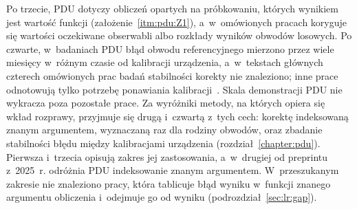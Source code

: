 Po trzecie, PDU dotyczy obliczeń opartych na próbkowaniu, których wynikiem jest wartość funkcji (założenie~\ref{itm:pdu:Z1}), a~w~omówionych pracach koryguje się wartości oczekiwane obserwabli albo rozkłady wyników obwodów losowych.
Po czwarte, w~badaniach PDU błąd obwodu referencyjnego mierzono przez wiele miesięcy w~różnym czasie od kalibracji urządzenia, a~w~tekstach głównych czterech omówionych prac badań stabilności korekty nie znaleziono; inne prace odnotowują tylko potrzebę ponawiania kalibracji~\cite{maciejewski_mitigation_2020,van_den_berg_probabilistic_2023,cai2023quantum}.
Skala demonstracji PDU nie wykracza poza pozostałe prace.
Za wyróżniki metody, na których opiera się wkład rozprawy, przyjmuje się drugą i~czwartą z~tych cech: korektę indeksowaną znanym argumentem, wyznaczaną raz dla rodziny obwodów, oraz zbadanie stabilności błędu między kalibracjami urządzenia (rozdział~\ref{chapter:pdu}).
Pierwsza i~trzecia opisują zakres jej zastosowania, a~w~drugiej od preprintu z~2025~r. odróżnia PDU indeksowanie znanym argumentem.
W~przeszukanym zakresie nie znaleziono pracy, która tablicuje błąd wyniku w~funkcji znanego argumentu obliczenia i~odejmuje go od wyniku (podrozdział~\ref{sec:lr:gap}).
